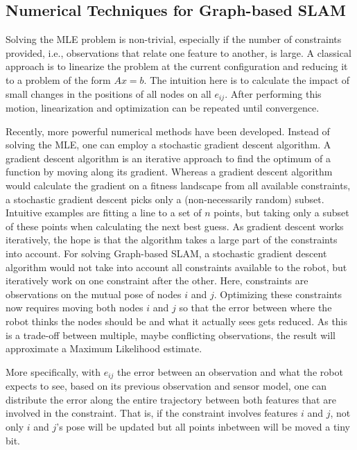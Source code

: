 \subsection{Numerical Techniques for Graph-based SLAM}
Solving the MLE problem is non-trivial, especially if the number of constraints provided, i.e., observations that relate one feature to another, is large. A classical approach is to linearize the problem at the current configuration and reducing it to a problem of the form $ Ax=b$. The intuition here is to calculate the impact of small changes in the positions of all nodes on all $ e_{ij}$. After performing this motion, linearization and optimization can be  repeated until convergence. 

Recently, more powerful numerical methods have been developed. Instead of solving the MLE, one can employ a stochastic gradient descent algorithm. A gradient descent algorithm is an iterative approach to find the optimum of a function by moving along its gradient. Whereas a gradient descent algorithm would calculate the gradient on a fitness landscape from all available constraints, a stochastic gradient descent picks only a (non-necessarily random) subset. Intuitive examples are fitting a line to a set of $n$ points, but taking only a subset of these points when calculating the next best guess. As gradient descent works iteratively, the hope is that the algorithm takes a large part of the constraints into account. For solving Graph-based SLAM, a stochastic gradient descent algorithm would not take into account all constraints available to the robot, but  iteratively work on one constraint after the other. Here, constraints are observations on the mutual pose of nodes $i$ and $j$. Optimizing these constraints now requires moving both nodes $i$ and $j$ so that the error between where the robot thinks the nodes should be and what it actually sees gets reduced.  As this is a trade-off between multiple, maybe conflicting observations, the result will approximate a Maximum Likelihood estimate.

More specifically, with $ e_{ij}$ the error between an observation and what the robot expects to see, based on its previous observation and sensor model, one can distribute the error along the entire trajectory between both features that are involved in the constraint. That is, if the constraint involves features $i$ and $j$, not only $i$ and $j$'s pose will be updated but all points inbetween will be moved a tiny bit.


